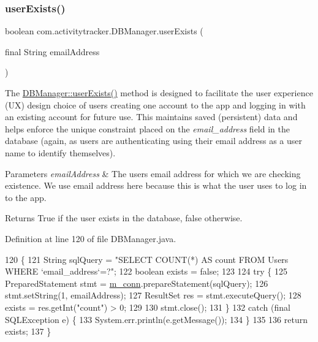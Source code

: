 \subsubsection{\texorpdfstring{user\+Exists()}{userExists()}}
{\footnotesize\ttfamily boolean com.\+activitytracker.\+D\+B\+Manager.\+user\+Exists (\begin{DoxyParamCaption}\item[{final String}]{email\+Address }\end{DoxyParamCaption})}

The \mbox{\hyperlink{classcom_1_1activitytracker_1_1_d_b_manager_af05d79f33ecf2920a67d1b9cf82c079f}{D\+B\+Manager\+::user\+Exists()}} method is designed to facilitate the user experience (UX) design choice of users creating one account to the app and logging in with an existing account for future use. This maintains saved (persistent) data and helps enforce the unique constraint placed on the {\itshape email\+\_\+address} field in the database (again, as users are authenticating using their email address as a user name to identify themselves).


\begin{DoxyParams}{Parameters}
{\em email\+Address} & The user\textquotesingle{}s email address for which we are checking existence. We use email address here because this is what the user uses to log in to the app. \\
\hline
\end{DoxyParams}
\begin{DoxyReturn}{Returns}
True if the user exists in the database, false otherwise. 
\end{DoxyReturn}


Definition at line 120 of file D\+B\+Manager.\+java.


\begin{DoxyCode}
120                                                           \{
121         String sqlQuery = \textcolor{stringliteral}{"SELECT COUNT(*) AS count FROM Users WHERE `email\_address`=?"};
122         \textcolor{keywordtype}{boolean} exists = \textcolor{keyword}{false};
123 
124         \textcolor{keywordflow}{try} \{
125             PreparedStatement stmt = \mbox{\hyperlink{classcom_1_1activitytracker_1_1_d_b_manager_a064088d13ac09eb147fdc19268771521}{m\_conn}}.prepareStatement(sqlQuery);
126             stmt.setString(1, emailAddress);
127             ResultSet res = stmt.executeQuery();
128             exists = res.getInt(\textcolor{stringliteral}{"count"}) > 0;
129 
130             stmt.close();
131         \}
132         \textcolor{keywordflow}{catch} (\textcolor{keyword}{final} SQLException e) \{
133             System.err.println(e.getMessage());
134         \}
135 
136         \textcolor{keywordflow}{return} exists;
137     \}
\end{DoxyCode}


